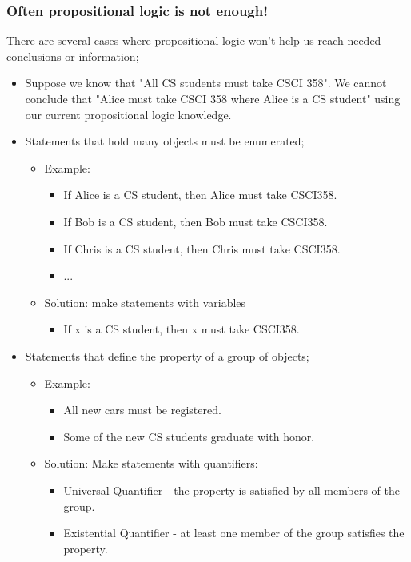 \documentclass[12pt, letterpaper]{article}
\begin{document}
\subsubsection*{Often propositional logic is not enough!} 
There are several cases where propositional logic won't help us reach needed conclusions or information; \\
\begin{itemize}[label={}, leftmargin=*]
	\item Suppose we know that "All CS students must take CSCI 358". We cannot conclude that "Alice must take CSCI 358 where Alice is a CS student" using our current propositional logic knowledge.
	\item Statements that hold many objects must be enumerated;
	\begin{itemize}
		\item Example:
		\begin{itemize}
			\item If Alice is a CS student, then Alice must take CSCI358.
			\item If Bob is a CS student, then Bob must take CSCI358.
			\item If Chris is a CS student, then Chris must take CSCI358.
			\item ...
		\end{itemize}
		\item Solution: make statements with variables
		\begin{itemize}
			\item If x is a CS student, then x must take CSCI358.
		\end{itemize}
	\end{itemize}
	\item Statements that define the property of a group of objects;
	\begin{itemize}
		\item Example:
		\begin{itemize}
			\item All new cars must be registered.
			\item Some of the new CS students graduate with honor.
		\end{itemize}
		\item Solution: Make statements with quantifiers:
		\begin{itemize}
			\item Universal Quantifier - the property is satisfied by all members of the group.
			\item Existential Quantifier - at least one member of the group satisfies the property.
		\end{itemize}
	\end{itemize}
\end{itemize}
\end{document}
